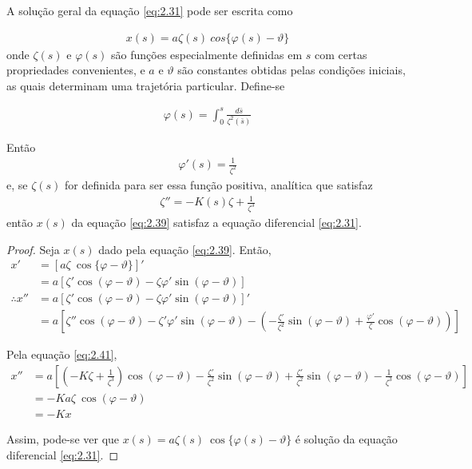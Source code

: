 A solução geral da equação \eqref{eq:2.31} pode ser escrita como
	
\begin{align}
	x(s) = a\zeta(s)\ cos\{\varphi(s)-\vartheta\}\label{eq:2.39}
\end{align}
onde $\zeta(s)$ e $\varphi(s)$ são funções especialmente definidas em $s$ com certas propriedades convenientes, e $a$ e $\vartheta$ são constantes obtidas pelas condições iniciais, as quais determinam uma trajetória particular. Define-se
	
\begin{align}
	\varphi(s) = \int_{0}^{s} \frac{d\bar{s}}{\zeta^2(\bar{s})}
\end{align}
	
Então
\begin{align}
	\varphi'(s) = \frac{1}{\zeta^2}
\end{align}
e, se $\zeta(s)$ for definida para ser essa função positiva, analítica que satisfaz
\begin{align}
	\zeta'' = -K(s)\zeta+\frac{1}{\zeta^3}\label{eq:2.41}
\end{align}
então $x(s)$ da equação \eqref{eq:2.39} satisfaz a equação diferencial \eqref{eq:2.31}.
	
\begin{proof}
	Seja $x(s)$ dado pela equação \eqref{eq:2.39}. Então,
	\begin{align*}
        x' &= [a\zeta\ \cos\{\varphi-\vartheta\}]'\\
        &= a[\zeta'\cos(\varphi-\vartheta)-\zeta\varphi'\sin(\varphi-\vartheta)]\\
        \therefore x'' &= a[\zeta'\cos(\varphi-\vartheta)-\zeta\varphi'\sin(\varphi-\vartheta)]'\\
        &= a\left[\zeta''\cos(\varphi-\vartheta)-\zeta'\varphi'\sin(\varphi-\vartheta) - \left(-\frac{\zeta'}{\zeta^2}\sin(\varphi-\vartheta)+\frac{\varphi'}{\zeta}\cos(\varphi-\vartheta)\right)\right]
	\end{align*}
	
	Pela equação \eqref{eq:2.41}, 
	\begin{align*}
        x'' &= a\left[\left(-K\zeta+\frac{1}{\zeta^3}\right)\cos(\varphi-\vartheta)-\frac{\zeta'}{\zeta^2}\sin(\varphi-\vartheta) + \frac{\zeta'}{\zeta^2}\sin(\varphi-\vartheta)-\frac{1}{\zeta^3}\cos(\varphi-\vartheta)\right]\\
        &= -Ka\zeta\ \cos(\varphi-\vartheta)\\
        &= -Kx
	\end{align*}
	
	Assim, pode-se ver que $x(s) = a\zeta(s)\ \cos\{\varphi(s)-\vartheta\}$ é solução da equação diferencial \eqref{eq:2.31}.
\end{proof}
	
